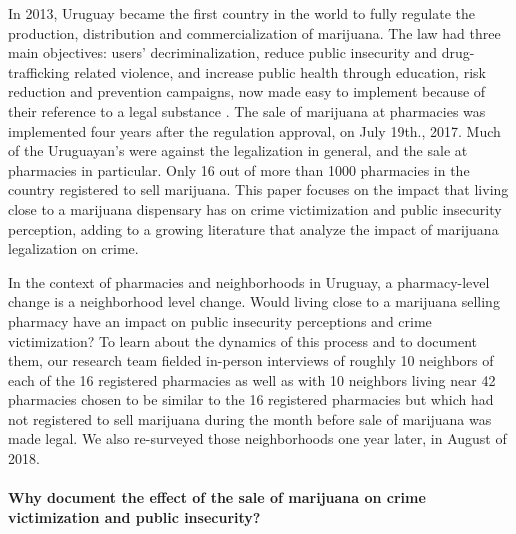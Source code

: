 \documentclass[11pt]{article}
\begin{document}
In 2013, Uruguay became the first country in the world to fully regulate the production, distribution and commercialization of marijuana. The law had three main objectives: users' decriminalization, reduce public insecurity and drug-trafficking related violence, and increase public health through education, risk reduction and prevention campaigns, now made easy to implement because of their reference to a legal substance \citep{arraras2014inventando, pardo2014cannabis, queirolo2019uruguay}. The sale of marijuana at pharmacies was implemented four years after the regulation approval, on July 19th., 2017. Much of the Uruguayan's were against the legalization in general, and the sale at pharmacies in particular. Only 16 out of more than 1000 pharmacies in the country registered to sell marijuana. This paper focuses on the impact that living close to a marijuana dispensary has on crime victimization and public insecurity perception, adding to a growing literature that analyze the impact of marijuana legalization on crime.  

In the context of pharmacies and neighborhoods in Uruguay, a pharmacy-level change is a neighborhood level change. Would living close to a marijuana selling pharmacy have an impact on public insecurity perceptions and crime victimization? To learn about the dynamics of this process and to document them, our research team fielded in-person interviews of roughly 10 neighbors of each of the 16 registered pharmacies as well as with 10 neighbors living near 42 pharmacies chosen to be similar to the 16 registered pharmacies but which had not registered to sell marijuana during the month before sale of marijuana was made legal. We also re-surveyed those neighborhoods one year later, in August of 2018.

\paragraph{Why document the effect of the sale of marijuana on crime victimization and public insecurity?}\\ 
\end{document}
